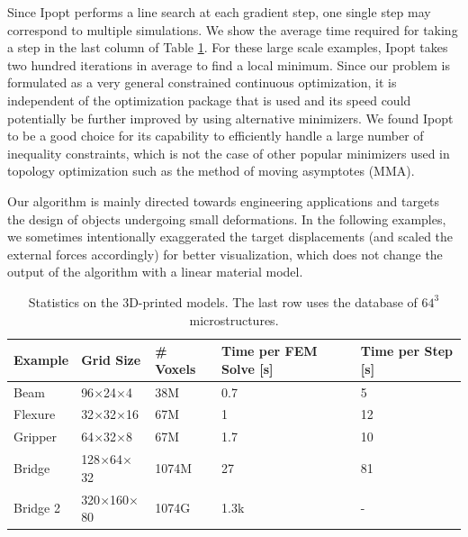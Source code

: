 	Since Ipopt performs a line search at each gradient step, one single step may correspond to multiple simulations. We show the average time required for taking a step in the last column of Table \ref{tab:results}. For these large scale examples, Ipopt takes two hundred iterations in average to find a local minimum. 
	Since our problem is formulated as a very general constrained continuous optimization, it is independent of the optimization package that is used and its speed could potentially be further improved by using alternative minimizers. 
	We found Ipopt to be a good choice for its capability to efficiently handle a large number of inequality constraints, which is not the case of other popular minimizers used in topology optimization such as the method of moving asymptotes (MMA).
	
	Our algorithm is mainly directed towards engineering applications and targets the design of objects undergoing small deformations. In the following examples, we sometimes intentionally exaggerated the target displacements (and scaled the external forces accordingly) for better visualization, which does not change the output of the algorithm with a linear material model.
	
	\begin{table}
		\centering
		\footnotesize
		\caption{Statistics on the 3D-printed models. The last row uses the database of $64^3$ microstructures.} 
		{
			\begin{tabularx}{\linewidth}{ |X| X | X | p{3cm}| p{3cm}| }
				\hline
				Example & Grid Size & \# Voxels & Time per FEM Solve [s] & Time per Step [s]\\ \hline
				Beam   & 96$\times$24$\times$4  & 38M  &  0.7 & 5\\
				Flexure & 32$\times$32$\times$16 & 67M  & 1 & 12\\
				Gripper   & 64$\times$32$\times$8  & 67M  & 1.7 & 10\\	\hline
				Bridge & 128$\times$64$\times$32 & 1074M  & 27 & 81\\
				Bridge 2 & 320$\times$160$\times$80 & 1074G  & 1.3k & - \\
				\hline
			\end{tabularx} }
			\label{tab:results}
		\end{table}
		
